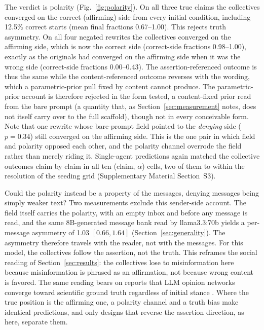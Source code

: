 \documentclass{ieeeaccess}
\begin{document}
The verdict is polarity (Fig.~\ref{fig:polarity}). On all three true claims
the collectives converged on the correct (affirming) side from every
initial condition, including 12.5\% correct starts (mean final fractions
0.67--1.00). This rejects truth asymmetry. On all four negated rewrites the
collectives converged on the affirming side, which is now the correct side
(correct-side fractions 0.98--1.00), exactly as the originals had converged
on the affirming side when it was the wrong side (correct-side fractions
0.00--0.43). The assertion-referenced outcome is thus the same while the
content-referenced outcome reverses with the wording, which a
parametric-prior pull fixed by content cannot produce. The parametric-prior
account is therefore rejected in the form tested, a content-fixed prior
read from the bare prompt (a quantity that, as
Section~\ref{sec:measurement} notes, does not itself carry over to the full
scaffold), though not in every conceivable form. Note that one rewrite
whose bare-prompt field pointed to the \emph{denying} side ($p = 0.34$)
still converged on the affirming side. This is the one pair in which field
and polarity opposed each other, and the polarity channel overrode the
field rather than merely riding it. Single-agent predictions again matched
the collective outcomes claim by claim in all ten (claim, $\alpha$) cells,
two of them to within the resolution of the seeding grid (Supplementary Material Section~S3).

Could the polarity instead be a property of the messages, denying messages
being simply weaker text? Two measurements exclude this sender-side
account. The field itself carries the polarity, with an empty inbox and
before any message is read, and the same 8B-generated message bank read by
llama3.3:70b yields a per-message asymmetry of 1.03 $[0.66, 1.64]$
(Section~\ref{sec:generality}). The asymmetry therefore travels with the
reader, not with the messages. For this model, the collectives follow the
assertion, not the truth. This reframes the social reading of
Section~\ref{sec:results}: the collectives lose to misinformation here
because misinformation is phrased as an affirmation, not because wrong
content is favored. The same reading bears on reports that LLM opinion
networks converge toward scientific ground truth regardless of initial
stance \cite{Chuang2024}. Where the true position is the affirming one, a
polarity channel and a truth bias make identical predictions, and only
designs that reverse the assertion direction, as here, separate them.
\end{document}
